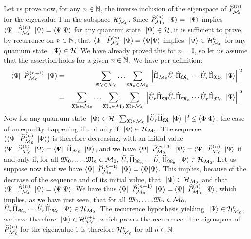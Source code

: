  Let us prove now, for any $n \in \IN$, the inverse inclusion of the eigenspace of $\op P_{\CMS_0}^{(n)}$ for the eigenvalue 1 in the subspace $\H_{\CMS_0}^n$. Since $\op P_{\CMS_0}^{(n)} \ket \Psi = \ket \Psi$ implies $\bra \Psi \op P_{\CMS_0}^{(n)} \ket \Psi = \braket \Psi \Psi$ for any quantum state $\ket \Psi \in \H$, it is sufficient to prove, by recurrence on $n \in \IN$, that $\bra \Psi \op P_{\CMS_0}^{(n)} \ket \Psi = \braket \Psi \Psi$ implies $\ket \Psi \in \H_{\CMS_0}^n$ for any quantum state $\ket \Psi \in \H$. We have already proved this for $n = 0$, so let us assume that the assertion holds for a given $n \in \IN$. We have per definition:
\begin{eqnarray*}
\bra \Psi \op P_{\CMS_0}^{(n+1)} \ket \Psi & = & \sum_{\cms_0 \in \CMS_0} \dotsc \sum_{\cms_n \in \CMS_0} \left\| \op \Pi_{\CMS_0} \op U_\tau \op \Pi_{\cms_n} \dotsm \op U_\tau \op \Pi_{\cms_0} \ket \Psi \right\|^2 \\
& = & \sum_{\cms_0 \in \CMS_0} \dotsc \sum_{\cms_n \in \CMS_0} \sum_{\cms \in \CMS_0} \left\| \op U_\tau \op \Pi_\cms \op U_\tau \op \Pi_{\cms_n} \dotsm \op U_\tau \op \Pi_{\cms_0} \ket \Psi \right\|^2
\end{eqnarray*}
Now for any quantum state $\ket \Phi \in \H$, $\sum_{\cms \in \CMS_0} \| \op U_\tau \op \Pi_\cms \ket \Phi \|^2 \leq \braket \Phi \Phi$, the case of an equality happening if and only if $\ket \Phi \in \H_{\CMS_0}$. The sequence $(\bra \Psi \op P_{\CMS_0}^{(n)} \ket \Psi)$ is therefore decreasing, with an initial value $\bra \Psi \op P_{\CMS_0}^{(0)} \ket \Psi = \bra \Psi \op \Pi_{\CMS_0} \ket \Psi$, and we have $\bra \Psi \op P_{\CMS_0}^{(n+1)} \ket \Psi = \bra \Psi \op P_{\CMS_0}^{(n)} \ket \Psi$ if and only if, for all $\cms_0, \dotsc, \cms_n \in \CMS_0$, $\op U_\tau \op \Pi_{\cms_n} \dotsm \op U_\tau \op \Pi_{\cms_0} \ket \Psi \in \H_{\CMS_0}$. Let us suppose now that we have $\bra \Psi \op P_{\CMS_0}^{(n+1)} \ket \Psi = \braket \Psi \Psi$. This implies, because of the decrease of the sequence and of its initial value, that $\ket \Psi \in \H_{\CMS_0}$ and that $\bra \Psi \op P_{\CMS_0}^{(n)} \ket \Psi = \braket \Psi \Psi$. We have thus $\bra \Psi \op P_{\CMS_0}^{(n+1)} \ket \Psi = \bra \Psi \op P_{\CMS_0}^{(n)} \ket \Psi$, which implies, as we have just seen, that for all $\cms_0, \dotsc, \cms_n \in \CMS_0$, $\op U_\tau \op \Pi_{\cms_n} \dotsm \op U_\tau \op \Pi_{\cms_0} \ket \Psi \in \H_{\CMS_0}$. The recurrence hypothesis yielding $\ket \Psi \in \H_{\CMS_0}^n$, we have therefore $\ket \Psi \in \H_{\CMS_0}^{n+1}$, which proves the recurrence. The eigenspace of $\op P_{\CMS_0}^{(n)}$ for the eigenvalue 1 is therefore $\H_{\CMS_0}^n$ for all $n \in \IN$.

